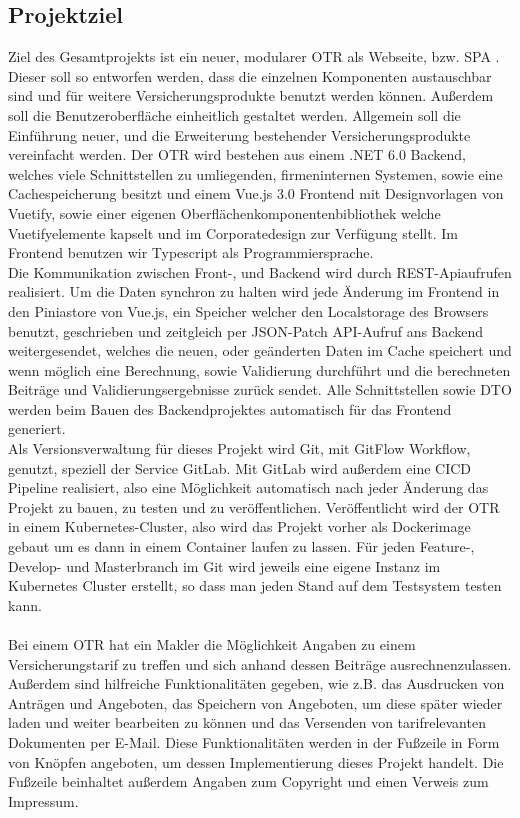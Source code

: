 \subsection{Projektziel}
\label{projektziel}
Ziel des Gesamtprojekts ist ein neuer, modularer \ac{OTR} als Webseite, bzw. \ac{SPA} . Dieser soll so entworfen werden, dass die einzelnen Komponenten austauschbar sind und für weitere Versicherungsprodukte benutzt werden können. Außerdem soll die Benutzeroberfläche einheitlich gestaltet werden. Allgemein soll die Einführung neuer, und die Erweiterung bestehender Versicherungsprodukte vereinfacht werden. Der \ac{OTR} wird bestehen aus einem .NET 6.0 Backend, welches viele Schnittstellen zu umliegenden, firmeninternen Systemen, sowie eine Cachespeicherung besitzt und einem Vue.js 3.0 Frontend mit Designvorlagen von Vuetify, sowie einer eigenen Oberflächenkomponentenbibliothek welche Vuetifyelemente kapselt und im Corporatedesign zur Verfügung stellt. Im Frontend benutzen wir Typescript als Programmiersprache.\\
Die Kommunikation zwischen Front-, und Backend wird durch REST-Apiaufrufen realisiert. Um die Daten synchron zu halten wird jede Änderung im Frontend in den Piniastore von Vue.js, ein Speicher welcher den Localstorage des Browsers benutzt, geschrieben und zeitgleich per JSON-Patch API-Aufruf ans Backend weitergesendet, welches die neuen, oder geänderten Daten im Cache speichert und wenn möglich eine Berechnung, sowie Validierung durchführt und die berechneten Beiträge und Validierungsergebnisse zurück sendet. Alle Schnittstellen sowie \ac{DTO} werden beim Bauen des Backendprojektes automatisch für das Frontend generiert.\\
Als Versionsverwaltung für dieses Projekt wird Git, mit GitFlow Workflow, genutzt, speziell der Service GitLab. Mit GitLab wird außerdem eine \ac{CICD} Pipeline realisiert, also eine Möglichkeit automatisch nach jeder Änderung das Projekt zu bauen, zu testen und zu veröffentlichen. Veröffentlicht wird der \ac{OTR} in einem Kubernetes-Cluster, also wird das Projekt vorher als Dockerimage gebaut um es dann in einem Container laufen zu lassen. Für jeden Feature-, Develop- und Masterbranch im Git wird jeweils eine eigene Instanz im Kubernetes Cluster erstellt, so dass man jeden Stand auf dem Testsystem testen kann.
\\\\
Bei einem \ac{OTR} hat ein Makler die Möglichkeit Angaben zu einem Versicherungstarif zu treffen und sich anhand dessen Beiträge ausrechnenzulassen. Außerdem sind hilfreiche Funktionalitäten gegeben, wie z.B. das Ausdrucken von Anträgen und Angeboten, das Speichern von Angeboten, um diese später wieder laden und weiter bearbeiten zu können und das Versenden von tarifrelevanten Dokumenten per E-Mail. Diese Funktionalitäten werden in der Fußzeile in Form von Knöpfen angeboten, um dessen Implementierung dieses Projekt handelt. Die Fußzeile beinhaltet außerdem Angaben zum Copyright und einen Verweis zum Impressum.
\\\\

